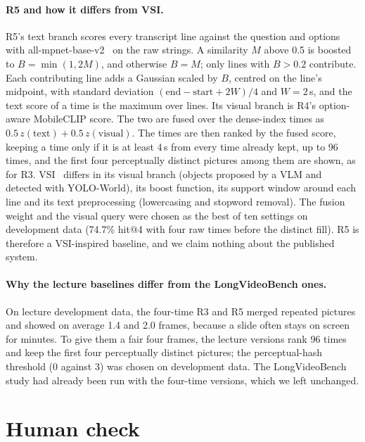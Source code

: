 \paragraph{R5 and how it differs from VSI.}
R5's text branch scores every transcript line against the question and options with all-mpnet-base-v2~\cite{song2020mpnet} on the raw strings.
A similarity $M$ above 0.5 is boosted to $B{=}\min(1, 2M)$, and otherwise $B{=}M$; only lines with $B > 0.2$ contribute.
Each contributing line adds a Gaussian scaled by $B$, centred on the line's midpoint, with standard deviation $(\text{end} - \text{start} + 2W)/4$ and $W{=}2$\,s, and the text score of a time is the maximum over lines.
Its visual branch is R4's option-aware MobileCLIP score.
The two are fused over the dense-index times as $0.5\,z(\text{text}) + 0.5\,z(\text{visual})$.
The times are then ranked by the fused score, keeping a time only if it is at least 4\,s from every time already kept, up to 96 times, and the first four perceptually distinct pictures among them are shown, as for R3.
VSI~\cite{he2025vsi} differs in its visual branch (objects proposed by a VLM and detected with YOLO-World), its boost function, its support window around each line and its text preprocessing (lowercasing and stopword removal).
The fusion weight and the visual query were chosen as the best of ten settings on development data (74.7\% hit@4 with four raw times before the distinct fill).
R5 is therefore a VSI-inspired baseline, and we claim nothing about the published system.

\paragraph{Why the lecture baselines differ from the LongVideoBench ones.}
On lecture development data, the four-time R3 and R5 merged repeated pictures and showed on average 1.4 and 2.0 frames, because a slide often stays on screen for minutes.
To give them a fair four frames, the lecture versions rank 96 times and keep the first four perceptually distinct pictures; the perceptual-hash threshold (0 against 3) was chosen on development data.
The LongVideoBench study had already been run with the four-time versions, which we left unchanged.

\section{Human check}
\label{sec:s-human}

